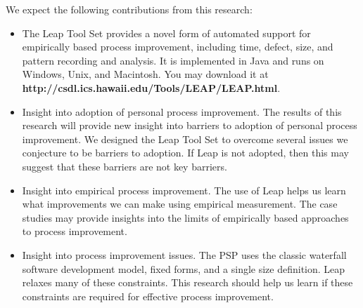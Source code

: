 We expect the following contributions from this research:
\begin{itemize}
  
\item{The Leap Tool Set provides a novel form of automated support for
    empirically based process improvement, including time, defect, size,
    and pattern recording and analysis. It is implemented in Java and runs
    on Windows, Unix, and Macintosh. You may download it at
    {\bf http://csdl.ics.hawaii.edu/Tools/LEAP/LEAP.html}. }
  
\item{Insight into adoption of personal process improvement.  The results
    of this research will provide new insight into barriers to adoption of
    personal process improvement.  We designed the Leap Tool Set to
    overcome several issues we conjecture to be barriers to adoption.  If
    Leap is not adopted, then this may suggest that these barriers are not
    key barriers.}
  
\item{Insight into empirical process improvement.  The use of Leap helps us
    learn what improvements we can make using empirical measurement.  The
    case studies may provide insights into the limits of empirically based
    approaches to process improvement.}
  
\item{Insight into process improvement issues.  The PSP uses the classic
    waterfall software development model, fixed forms, and a single size
    definition. Leap relaxes many of these constraints.  This research
    should help us learn if these constraints are required for effective
    process improvement. }


\end{itemize}





